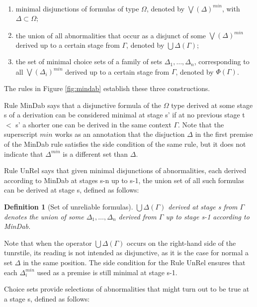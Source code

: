 \documentclass[]{article}
\newtheorem{definition}{Definition}
\begin{document}
\begin{enumerate}
\item  minimal disjunctions of formulas of type $\Omega$, denoted by $\bigvee(\Delta)^{min}$, with $\Delta \subset \Omega$;
\item the union of all abnormalities that occur as a disjunct of some $\bigvee(\Delta)^{min}$ derived up to a certain stage from $\Gamma$, denoted by $\bigcup\Delta(\Gamma)$;
\item the set of minimal choice sets of a family of sets $\Delta_1, \ldots, \Delta_n$, corresponding to all $\bigvee(\Delta_i)^{min}$ derived up to a certain stage from $\Gamma$, denoted by $\Phi(\Gamma)$.
\end{enumerate}

The rules in Figure \ref{fig:mindab} establish these three constructions.

Rule {\sf MinDab} says that a disjunctive formula of the $\Omega$ type derived at some stage {\sf s} of a derivation can be considered minimal at stage {\sf s'} if at no previous stage {\sf t} $<$ {\sf s'} a shorter one can be derived in the same context $\Gamma$. Note that the superscript $min$ works as an annotation that the disjuction $\Delta$ in the first premise of the {\sf MinDab} rule satisfies the side condition of the same rule, but it does not indicate that $\Delta^{min}$ is a different set than $\Delta$.

Rule {\sf UnRel} says that given minimal disjunctions of abnormalities, each derived according to {\sf MinDab} at stages {\sf s-n} up to {\sf s-1}, the union set of all such formulas can be derived at stage {\sf s}, defined as follows:

\begin{definition}[Set of unreliable formulas]
$\bigcup\Delta(\Gamma)$ derived at stage {\sf s} from $\Gamma$ denotes the union of some $\Delta_{1}, \dots, \Delta_{n}$ derived from $\Gamma$ up to stage {\sf s-1} according to {\sf MinDab}.
\end{definition}
Note that when the operator $\bigcup\Delta(\Gamma)$ occurs on the right-hand side of the tunrstile, its reading is not intended as disjunctive, as it is the case for normal a set $\Delta$ in the same position. The side condition for the Rule {\sf UnRel} ensures that each $\Delta_{i}^{min}$ used as a premise is still minimal at stage {\sf s-1}.

Choice sets provide selections of abnormalities that might turn out to be true at a stage {\sf s}, defined as follows:
\end{document}
